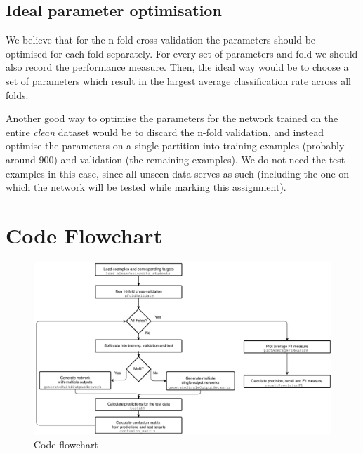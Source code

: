 \documentclass[a4paper]{article}
\begin{document}
\subsection{Ideal parameter optimisation}

We believe that for the n-fold cross-validation the parameters should be optimised for each fold separately. For every set of parameters and fold we should also record the performance measure. Then, the ideal way would be to choose a set of parameters which result in the largest average classification rate across all folds.\medskip

Another good way to optimise the parameters for the network trained on the entire \emph{clean} dataset would be to discard the n-fold validation, and instead optimise the parameters on a single partition into training examples (probably around 900) and validation (the remaining examples). We do not need the test examples in this case, since all unseen data serves as such (including the one on which the network will be tested while marking this assignment).

\clearpage


\section{Code Flowchart}

\begin{figure}[H]
\center
\includegraphics[width=1\columnwidth]{flowchart}
\caption{Code flowchart}
\label{flowchart}
\end{figure}
\end{document}
